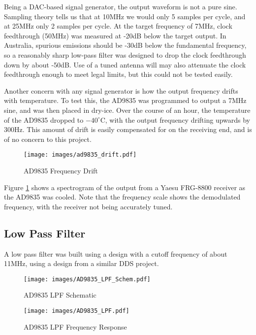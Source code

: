\documentclass[a4paper,12pt]{article}
\begin{document}
Being a DAC-based signal generator, the output waveform is not a pure sine. Sampling theory tells us that at 10MHz we would only 5 samples per cycle, and at 25MHz only 2 samples per cycle. At the target frequency of 7MHz, clock feedthrough (50MHz) was measured at -20dB below the target output. In Australia, spurious emissions should be -30dB below the fundamental frequency, so a reasonably sharp low-pass filter was designed to drop the clock feedthrough down by about -50dB. Use of a tuned antenna will may also attenuate the clock feedthrough enough to meet legal limits, but this could not be tested easily.

Another concern with any signal generator is how the output frequency drifts with temperature. To test this, the AD9835 was programmed to output a 7MHz sine, and was then placed in dry-ice. Over the course of an hour, the temperature of the AD9835 dropped to $-40^\circ$C, with the output frequency drifting upwards by 300Hz. This amount of drift is easily compensated for on the receiving end, and is of no concern to this project.

\begin{figure}[h]
  \begin{center}
    \texttt{[image: images/ad9835\_drift.pdf]}
  \end{center}
  \caption{AD9835 Frequency Drift}
  \label{fig:ad9835_drift}
\end{figure}

Figure \ref{fig:ad9835_drift} shows a spectrogram of the output from a Yaesu FRG-8800 receiver as the AD9835 was cooled. Note that the frequency scale shows the demodulated frequency, with the receiver not being accurately tuned. 

\subsection{Low Pass Filter}
A low pass filter was built using a design with a cutoff frequency of about 11MHz, using a design from a similar DDS project\citep{ref:lpf}.  

\begin{figure}[h]
  \begin{center}
    \texttt{[image: images/AD9835\_LPF\_Schem.pdf]}
  \end{center}
  \caption{AD9835 LPF Schematic}
  \label{fig:ad9835_lpf_schem}
\end{figure}

\begin{figure}[h]
  \begin{center}
    \texttt{[image: images/AD9835\_LPF.pdf]}
  \end{center}
  \caption{AD9835 LPF Frequency Response}
  \label{fig:ad9835_lpf}
\end{figure}
\end{document}

